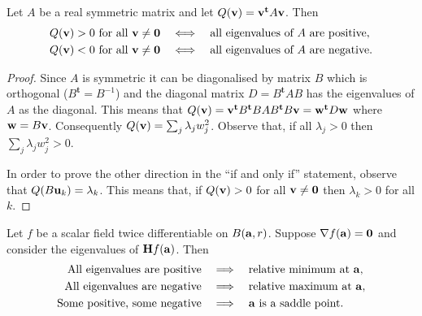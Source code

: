 \begin{theorem}
    Let \(A\) be a real symmetric matrix and let
    \(Q(\vv) =  \vv^{\mathbf{t}} A  \vv  \).
    Then
    \[
        \begin{aligned}
            \text{\(Q(\vv) > 0\) for all \(\vv \neq \mathbf{0}\)}
             & \quad \Longleftrightarrow \quad
            \text{all eigenvalues of \(A\) are positive}, \\
            \text{\(Q(\vv) < 0\) for all \(\vv \neq \mathbf{0}\)}
             & \quad \Longleftrightarrow \quad
            \text{all eigenvalues of \(A\) are negative}.
        \end{aligned}
    \]
\end{theorem}

\begin{proof}
    Since \(A\) is symmetric it can be diagonalised by  matrix \(B\)  which is orthogonal (\(B^{\mathbf{t}}=B^{-1}\))
    and the diagonal matrix \(D = B^{\mathbf{t}} A B\) has the eigenvalues of \(A\) as the diagonal.
    This means that
    \(Q(\vv) = \vv^{\mathbf{t}} B^{\mathbf{t}} B A B^{\mathbf{t}} B \vv = \ww^{\mathbf{t}} D \ww \)
    where \(\ww = B \vv\).
    Consequently \(Q(\vv) =  \sum_{j} \lambda_j w_j^2\).
    Observe that, if all \(\lambda_j >0\) then \( \sum_{j} \lambda_j w_j^2  >0\).

    In order to prove the other direction in the ``if and only if'' statement, observe that \(Q(B \uu_k ) = \lambda_k\). This means that, if \(Q(\vv) > 0\) for all \(\vv \neq \mathbf{0}\) then \(\lambda_k>0\) for all \(k\).
\end{proof}

\begin{theorem}
    Let \(f\) be a scalar field twice differentiable on \(B(\aa,r)\).
    Suppose  \(\nabla f(\aa) = \mathbf{0}\) and consider the eigenvalues of  \(\mathbf{H} f (\aa)\).
    Then
    \[
        \begin{aligned}
            \text{{All} eigenvalues are positive}
             & \quad \Longrightarrow \quad
            \text{relative minimum at \(\aa\)}, \\
            \text{{All} eigenvalues are negative}
             & \quad \Longrightarrow \quad
            \text{relative maximum at \(\aa\)}, \\
            \text{Some positive, some negative}
             & \quad \Longrightarrow \quad
            \text{\(\aa\) is a saddle point}.
        \end{aligned}
    \]
\end{theorem}

